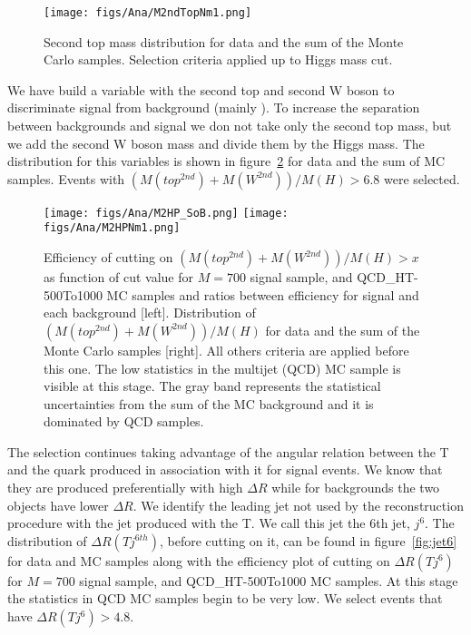 \begin{figure}[!Hhtbp]
  \begin{center}
    \texttt{[image: figs/Ana/M2ndTopNm1.png]}
    \caption{Second top mass distribution for data and the sum of the Monte Carlo samples. Selection criteria applied up to Higgs mass cut.}
    \label{fig:2ndTM}
  \end{center}
\end{figure}

We have build a variable with the second top and second W boson to discriminate signal from background (mainly \ttbar). To increase the separation between backgrounds and signal we don not take only the second top mass, but we add the second W boson mass and divide them by the Higgs mass. The distribution for this variables is shown in figure~\ref{fig:m2thp} for data and the sum of MC samples. Events with $(M(top^{2nd})+M(W^{2nd}))/M(H)>6.8$ were selected.

\begin{figure}[!Hhtbp]
  \begin{center}
    \texttt{[image: figs/Ana/M2HP\_SoB.png]}
    \texttt{[image: figs/Ana/M2HPNm1.png]}
    \caption{Efficiency of cutting on $(M(top^{2nd})+M(W^{2nd}))/M(H)>x$ as function of cut value for $M=700$ \GeVcc signal sample, \ttbar and QCD\_HT-500To1000 MC samples and ratios between efficiency for signal and each background [left]. Distribution of $(M(top^{2nd})+M(W^{2nd}))/M(H)$ for data and the sum of the Monte Carlo samples [right]. All others criteria are applied before this one. The low statistics in the multijet (QCD) MC sample is visible at this stage. The gray band represents the statistical uncertainties from the sum of the MC background and it is dominated by QCD samples.}
    \label{fig:m2thp}
  \end{center}
\end{figure}

The selection continues taking advantage of the angular relation between the T and the quark produced in association with it for signal events. We know that they are produced preferentially with high $\Delta R$ while for backgrounds the two objects have lower $\Delta R$. We identify the leading jet not used by the reconstruction procedure with the jet produced with the T. We call this jet the 6th jet, $j^{6}$. The distribution of $\Delta R (T j^{6th})$, before cutting on it, can be found in figure~\ref{fig:jet6} for data and MC samples along with the efficiency plot of cutting on $\Delta R (T j^{6})$ for $M=700$ \GeVcc signal sample, \ttbar and QCD\_HT-500To1000 MC samples. At this stage the statistics in QCD MC samples begin to be very low. We select events that have $\Delta R (T j^{6})>4.8$. 

